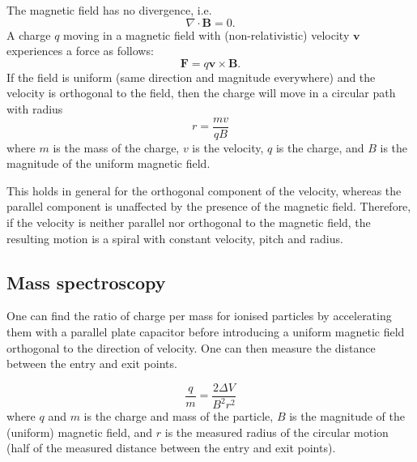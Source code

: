 \documentclass[a4paper, 12pt]{article}
\renewcommand{\vec}[1]{\mathbf{#1}}
\newcommand{\B}{\ensuremath{\vec{B}}}
\begin{document}
        The magnetic field has no divergence, i.e.
        \begin{equation}
            \nabla \cdot \B = 0.
        \end{equation}
        A charge $q$ moving in a magnetic field with (non-relativistic) velocity $\vec{v}$ experiences a force as follows: 
        \begin{equation}
            \vec{F} = q\vec{v}\times \B.
        \end{equation}
        If the field is uniform (same direction and magnitude everywhere) and the velocity is orthogonal to the field, 
        then the charge will move in a circular path with radius
        \begin{equation}
            r = \frac{mv}{qB}
        \end{equation}
        where $m$ is the mass of the charge, $v$ is the velocity, $q$ is the charge, 
        and $B$ is the magnitude of the uniform magnetic field.
        
        This holds in general for the orthogonal component of the velocity, 
        whereas the parallel component is unaffected by the presence of the magnetic field. 
        Therefore, if the velocity is neither parallel nor orthogonal to the magnetic field, 
        the resulting motion is a spiral with constant velocity, pitch and radius.
        
    \subsection{Mass spectroscopy}
        One can find the ratio of charge per mass for ionised particles by accelerating them with a parallel plate capacitor 
        before introducing a uniform magnetic field orthogonal to the direction of velocity. 
        One can then measure the distance between the entry and exit points.
        
        \begin{equation}
            \frac{q}{m} = \frac{2 \Delta V}{B^2 r^2}
        \end{equation}
        where $q$ and $m$ is the charge and mass of the particle, $B$ is the magnitude of the (uniform) magnetic field, 
        and $r$ is the measured radius of the circular motion (half of the measured distance between the entry and exit points).
        
\end{document}

